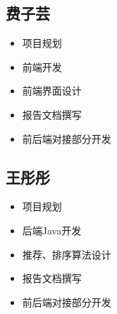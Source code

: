 \documentclass{report}
\begin{document}
\subsection*{费子芸}
\begin{itemize}
    \item 项目规划
    \item 前端开发
    \item 前端界面设计
    \item 报告文档撰写
    \item 前后端对接部分开发
\end{itemize}
\subsection*{王彤彤}
\begin{itemize}
    \item 项目规划
    \item 后端Java开发
    \item 推荐、排序算法设计
    \item 报告文档撰写
    \item 前后端对接部分开发
\end{itemize}
\end{document}
